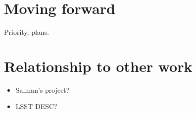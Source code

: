 \documentclass[draftmode,draftwater]{memarticle}
\begin{document}


\chapter{Moving forward}

Priority, plans.

\chapter{Relationship to other work}

\begin{itemize}
\item Salman's project?
\item LSST DESC?
\end{itemize}

\appendix
\end{document}
